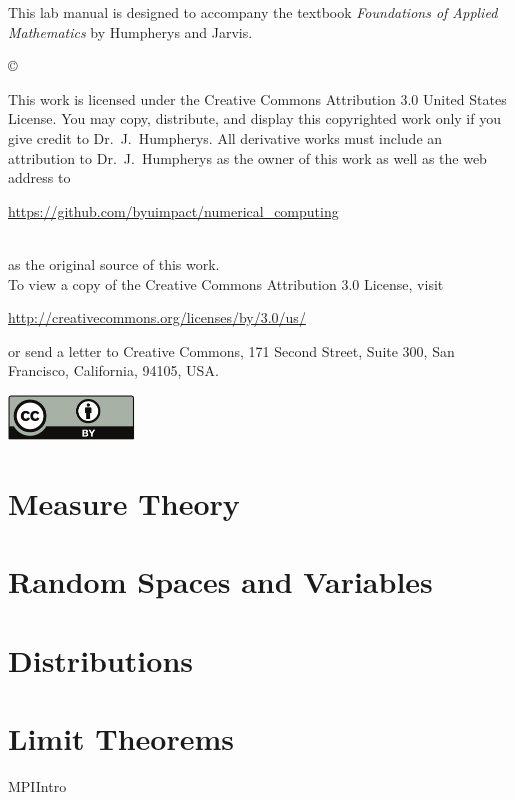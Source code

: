 \documentclass[nociteref]{newsiambook}
\begin{document}
\begin{thepreface}
This lab manual is designed to accompany the textbook \emph{Foundations of Applied Mathematics} by Humpherys and Jarvis.

\vfill
\copyright{This work is licensed under the Creative Commons Attribution 3.0 United States 
License.  You may copy, distribute, and display this copyrighted work only if you give 
credit to Dr.~J.~Humpherys. All derivative works must include an attribution to Dr.~J.~Humpherys as the owner of this work as well as the web address to 
\\\centerline{\url{https://github.com/byuimpact/numerical_computing}}\\ as the original source of 
this 
work.\\To view a copy of the Creative Commons Attribution 3.0 License, 
visit\\\centerline{\url{http://creativecommons.org/licenses/by/3.0/us/}} or send a letter to 
Creative Commons, 171 Second Street, Suite 300, San Francisco, California, 94105, USA.}

\vfill
\centering\includegraphics[height=1.2cm]{by}
\vfill
\end{thepreface}

\setcounter{tocdepth}{1}
\tableofcontents

\mainmatter

\part{Measure Theory}

\part{Random Spaces and Variables}

\part{Distributions}

\part{Limit Theorems}
{MPIIntro}
\end{document}
